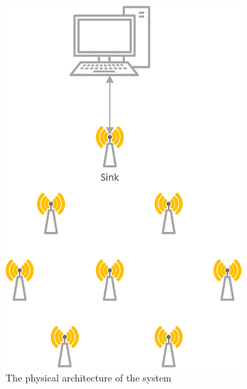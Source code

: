 \begin{figure}[htbp]
	\centering
	\begin{subfigure}[t]{0.4\textwidth}
		\centering
    		\includegraphics[scale=0.7]{content/images/Architecture}
   	 	\caption{The physical architecture of the system}
    	\label{fig:density}
    \end{subfigure}
    \quad
    \quad
    \quad
    \begin{subfigure}[t]{0.4\textwidth}
		\centering         

\end{subfigure}
\end{figure}
